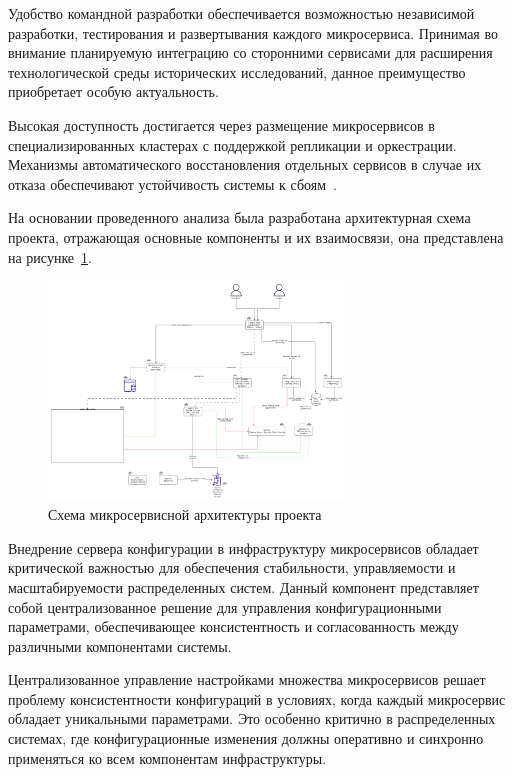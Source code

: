 Удобство командной разработки обеспечивается возможностью независимой разработки, тестирования и развертывания каждого микросервиса. Принимая во внимание планируемую интеграцию со сторонними сервисами для расширения технологической среды исторических исследований, данное преимущество приобретает особую актуальность.

Высокая доступность достигается через размещение микросервисов в специализированных кластерах с поддержкой репликации и оркестрации. Механизмы автоматического восстановления отдельных сервисов в случае их отказа обеспечивают устойчивость системы к сбоям~\cite{16_schermann2016}.

На основании проведенного анализа была разработана архитектурная схема проекта, отражающая основные компоненты и их взаимосвязи, она представлена на рисунке~\ref{fig:microservices_schema}.

\begin{figure}[htbp]
    \centering
    \includegraphics[width=0.7\textwidth]{Dissertation/images/project_scheme}
    \caption{Схема микросервисной архитектуры проекта}
    \label{fig:microservices_schema}
\end{figure}

Внедрение сервера конфигурации в инфраструктуру микросервисов обладает критической важностью для обеспечения стабильности, управляемости и масштабируемости распределенных систем. Данный компонент представляет собой централизованное решение для управления конфигурационными параметрами, обеспечивающее консистентность и согласованность между различными компонентами системы.

Централизованное управление настройками множества микросервисов решает проблему консистентности конфигураций в условиях, когда каждый микросервис обладает уникальными параметрами. Это особенно критично в распределенных системах, где конфигурационные изменения должны оперативно и синхронно применяться ко всем компонентам инфраструктуры.


